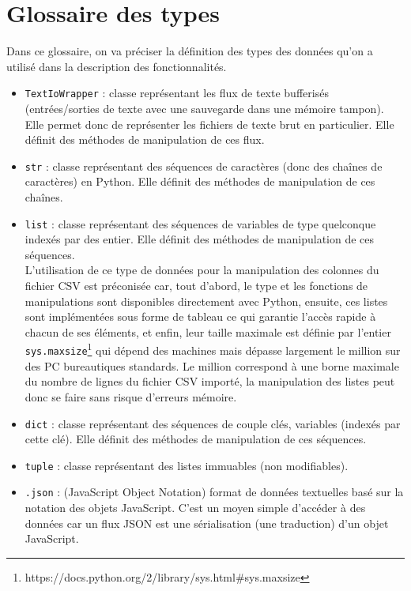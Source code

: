 	\section{Glossaire des types}
		Dans ce glossaire, on va préciser la définition des types des données qu'on a utilisé dans la description des fonctionnalités.
		\begin{itemize}
			\item \lstinline!TextIoWrapper! : classe représentant les flux de texte bufferisés (entrées/sorties de texte avec une sauvegarde dans une mémoire tampon). Elle permet donc de représenter les fichiers de texte brut en particulier. Elle définit des méthodes de manipulation de ces flux.
			\item \lstinline!str! : classe représentant des séquences de caractères (donc des chaînes de caractères) en Python. Elle définit des méthodes de manipulation de ces chaînes.
			\item \lstinline!list! : classe représentant des séquences de variables de type quelconque indexés par des entier. Elle définit des méthodes de manipulation de ces séquences.\\
			L'utilisation de ce type de données pour la manipulation des colonnes du fichier CSV est préconisée car, tout d'abord, le type et les fonctions de manipulations sont disponibles directement avec Python, ensuite, ces listes sont implémentées sous forme de tableau ce qui garantie l'accès rapide à chacun de ses éléments, et enfin, leur taille maximale est définie par l'entier \lstinline!sys.maxsize!\footnote{https://docs.python.org/2/library/sys.html\#sys.maxsize} qui dépend des machines mais dépasse largement le million sur des PC bureautiques standards. Le million correspond à une borne maximale du nombre de lignes du fichier CSV importé, la manipulation des listes peut donc se faire sans risque d'erreurs mémoire.
			\item \lstinline!dict! : classe représentant des séquences de couple clés, variables (indexés par cette clé). Elle définit des méthodes de manipulation de ces séquences.		
			\item \lstinline!tuple! : classe représentant des listes immuables (non modifiables).
			\item \lstinline!.json! : (JavaScript Object Notation) format de données textuelles basé sur la notation des objets JavaScript. C'est un moyen simple d'accéder à des données car un flux JSON est une sérialisation (une traduction) d'un objet JavaScript.
 		\end{itemize}
	
